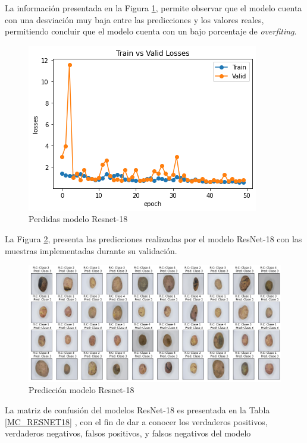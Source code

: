 		La información presentada en la Figura \ref{fig:perdda_RESNET18}, permite observar que el modelo cuenta con una desviación muy baja entre las predicciones y los valores reales, permitiendo concluir que el modelo cuenta con un bajo porcentaje de \textit{overfiting}. 
		
		\begin{figure}[ht]
			\centering
			\includegraphics[scale=0.55]{Figs/110.png}
			\caption{Perdidas modelo Resnet-18}
			\label{fig:perdda_RESNET18}
		\end{figure}

	\newpage
	La Figura \ref{fig:pre_RESNET18}, presenta las predicciones realizadas por el modelo ResNet-18 con las muestras implementadas durante su validación.
	
	\begin{figure}[ht]
		\centering
		\includegraphics[scale=0.4]{Figs/111.png}
		\caption{Predicción modelo Resnet-18}
		\label{fig:pre_RESNET18}
	\end{figure}

	La matriz de confusión del modelos ResNet-18 es presentada en la Tabla \ref*{MC_RESNET18} , con el fin de dar a conocer los verdaderos positivos, verdaderos negativos, falsos positivos, y falsos negativos del modelo

